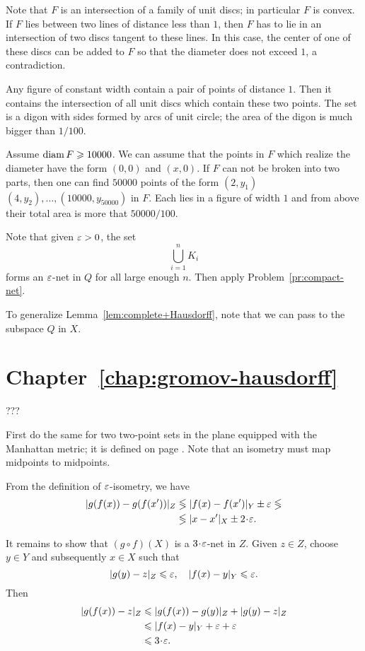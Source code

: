 Note that $F$ is an intersection of a family of unit discs; in particular $F$ is convex.
If $F$ lies between two lines of distance less than $1$, then
$F$ has to lie in an intersection of two discs tangent to these lines.
In this case, the center of one of these discs can be added to $F$ so that the diameter does not exceed $1$,
a contradiction.

Any figure of constant width contain a pair of points of distance $1$.
Then it contains the intersection of all unit discs which contain these two points.
The set is a digon with sides formed by arcs of unit circle;
the area of the digon is much bigger than $1/100$.

Assume $\operatorname{diam} F\geqslant 10000$.
We can assume that the points in $F$ which realize the diameter have the form $(0,0)$ and $(x,0)$.
If $F$ can not be broken into two parts, then one can find $50000$ points 
of the form $(2,y_1)$ $(4,y_2),\dots,(10000,y_{50000})$ in $F$.
Each lies in a figure of width $1$ and from above their total area is more that $50000/100$.
  

 Note that given $\varepsilon>0$, the set
$$\bigcup_{i=1}^n K_i$$
forms an $\varepsilon$-net in $Q$ for all large enough $n$.
Then apply Problem~\ref{pr:compact-net}.

To generalize Lemma~\ref{lem:complete+Hausdorff},
note that we can pass to the subspace $Q$ in $X$.

\section*{Chapter~\ref{chap:gromov-hausdorff}}



???


 First do the same for two two-point sets in the plane equipped with the Manhattan metric; it is defined on page \pageref{manhattan-metric}.  Note that an isometry must map midpoints to midpoints.


From the definition of $\varepsilon$-isometry,
we have
\begin{align*}
|g(f(x)) - g(f(x'))|_Z 
&\lege |f(x) - f(x')|_Y \pm \eps 
\lege
\\
&\lege |x - x'|_X \pm 2\cdot\eps.
\end{align*}
  
It remains to show that $(g \circ f)(X)$ is a $3\cdot\eps$-net in $Z$.  Given $z \in Z$, choose $y \in Y$ and subsequently $x \in X$ such that
$$|g(y) - z|_Z \leqslant \varepsilon, \quad |f(x) - y|_Y \leqslant \varepsilon.$$  Then
\begin{align*}
|g(f(x)) - z|_Z &\leq |g(f(x)) - g(y)|_Z + |g(y) - z|_Z\\
&\leq |f(x) - y|_Y + \eps + \eps\\
&\leq 3\cdot\eps.
\end{align*}


